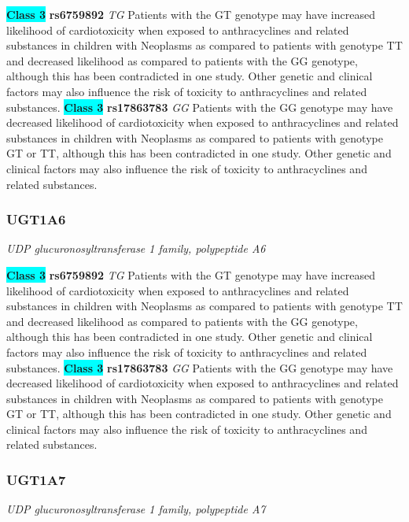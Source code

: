 \documentclass{report}
\begin{document}
\textbf{\colorbox{cyan} {Class 3}} \textbf{ rs6759892 } \textit{ TG }
Patients with the GT genotype may have increased likelihood of cardiotoxicity when exposed to anthracyclines and related substances in children with Neoplasms as compared to patients with genotype TT and decreased likelihood as compared to patients with the GG genotype, although this has been contradicted in one study. Other genetic and clinical factors may also influence the risk of toxicity to anthracyclines and related substances. \newline\textbf{\colorbox{cyan} {Class 3}} \textbf{ rs17863783 } \textit{ GG }
Patients with the GG genotype may have decreased likelihood of cardiotoxicity when exposed to anthracyclines and related substances in children with Neoplasms as compared to patients with genotype GT or TT, although this has been contradicted in one study. Other genetic and clinical factors may also influence the risk of toxicity to anthracyclines and related substances.
\newline\subsubsection{ UGT1A6 }
\textit{ UDP glucuronosyltransferase 1 family, polypeptide A6 }

\textbf{\colorbox{cyan} {Class 3}} \textbf{ rs6759892 } \textit{ TG }
Patients with the GT genotype may have increased likelihood of cardiotoxicity when exposed to anthracyclines and related substances in children with Neoplasms as compared to patients with genotype TT and decreased likelihood as compared to patients with the GG genotype, although this has been contradicted in one study. Other genetic and clinical factors may also influence the risk of toxicity to anthracyclines and related substances. \newline\textbf{\colorbox{cyan} {Class 3}} \textbf{ rs17863783 } \textit{ GG }
Patients with the GG genotype may have decreased likelihood of cardiotoxicity when exposed to anthracyclines and related substances in children with Neoplasms as compared to patients with genotype GT or TT, although this has been contradicted in one study. Other genetic and clinical factors may also influence the risk of toxicity to anthracyclines and related substances.
\newline\subsubsection{ UGT1A7 }
\textit{ UDP glucuronosyltransferase 1 family, polypeptide A7 }
\end{document}
